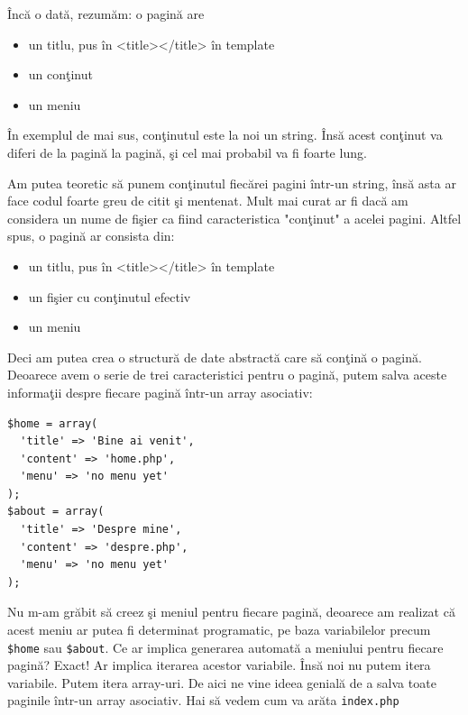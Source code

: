 Încă o dată, rezumăm: o pagină are
\begin{itemize}
\item un titlu, pus în <title></title> în template
\item un conţinut
\item un meniu
\end{itemize}
În exemplul de mai sus, conţinutul este la noi un string. Însă acest conţinut
va diferi de la pagină la pagină, şi cel mai probabil va fi foarte lung.

Am putea teoretic să punem conţinutul fiecărei pagini într-un string, însă
asta ar face codul foarte greu de citit şi mentenat. Mult mai curat ar fi
dacă am considera un nume de fişier ca fiind caracteristica "conţinut"
a acelei pagini. Altfel spus, o pagină ar consista din:
\begin{itemize}
\item un titlu, pus în <title></title> în template
\item un fişier cu conţinutul efectiv
\item un meniu
\end{itemize}
Deci am putea crea o structură de date abstractă care să conţină o pagină.
Deoarece avem o serie de trei caracteristici pentru o pagină, putem
salva aceste informaţii despre fiecare pagină într-un array asociativ:
\begin{lstlisting}
$home = array(
  'title' => 'Bine ai venit',
  'content' => 'home.php',
  'menu' => 'no menu yet'
);
$about = array(
  'title' => 'Despre mine',
  'content' => 'despre.php',
  'menu' => 'no menu yet'
);
\end{lstlisting}
Nu m-am grăbit să creez şi meniul pentru fiecare pagină, deoarece
am realizat că acest meniu ar putea fi determinat programatic, pe baza
variabilelor precum \texttt{\$home} sau \texttt{\$about}. Ce ar implica
generarea automată a meniului pentru fiecare pagină? Exact! Ar
implica iterarea acestor variabile. Însă noi nu putem itera variabile.
Putem itera array-uri. De aici ne vine ideea genială de a salva toate
paginile într-un array asociativ. 
Hai să vedem cum va arăta \texttt{index.php}

